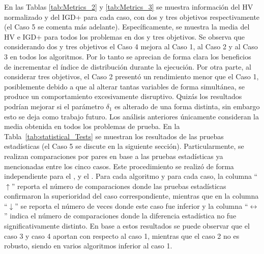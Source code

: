 En las Tablas \ref{tab:Metrics_2} y \ref{tab:Metrics_3} se muestra información del HV normalizado \cite{zitzler1999multiobjective} y del IGD+ \cite{Joel:IGDPlus_And_GDPlus} para cada caso, con
dos y tres objetivos respectivamente (el Caso 5 se comenta más adelante).
%
Específicamente, se muestra la media del HV e IGD+ para todos los problemas en dos y tres objetivos.
%
Se observa que considerando dos y tres objetivos el Caso 4 mejora al Caso 1, al Caso 2 y al Caso 3 en todos los algoritmos.
%
Por lo tanto se aprecian de forma clara los beneficios de incrementar el índice de distribución durante la ejecución.
%
Por otra parte, al considerar tres objetivos, el Caso 2 presentó un rendimiento menor que el Caso 1, 
posiblemente debido a que al alterar tantas variables de forma simultánea, se produce un comportamiento excesivamente disruptivo.
%
Quizás los resultados podrían mejorar si el parámetro $\delta_1$ es alterado de una forma distinta, sin embargo esto se deja como trabajo futuro.
%
Los análisis anteriores únicamente consideran la media obtenida en todos los problemas de prueba.
%
En la Tabla~\ref{tab:statistical_Tests} se muestran los resultados de las pruebas estadísticas (el Caso 5 se discute en la siguiente sección).
%
Particularmente, se realizan comparaciones por pares en base a las pruebas estadísticas ya mencionadas entre los cinco casos.
%
Este procedimiento se realizó de forma independiente para el \NSGAII{}, \MOEAD{} y el \SMSEMOA{}.
%
Para cada algoritmo y para cada caso, la columna ``$\uparrow$'' reporta el número de comparaciones donde las pruebas estadísticas confirmaron 
la superioridad del caso correspondiente, mientras que en la columna ``$\downarrow$'' se reporta el número de veces donde este caso fue inferior 
y la columna ``$\longleftrightarrow$'' indica el número de comparaciones donde la diferencia estadística no fue significativamente distinto.
%
En base a estos resultados se puede observar que el caso 3 y caso 4 aportan con respecto al caso 1, mientras que el caso 2 no es
robusto, siendo en varios algoritmos inferior al caso 1.
%
%
